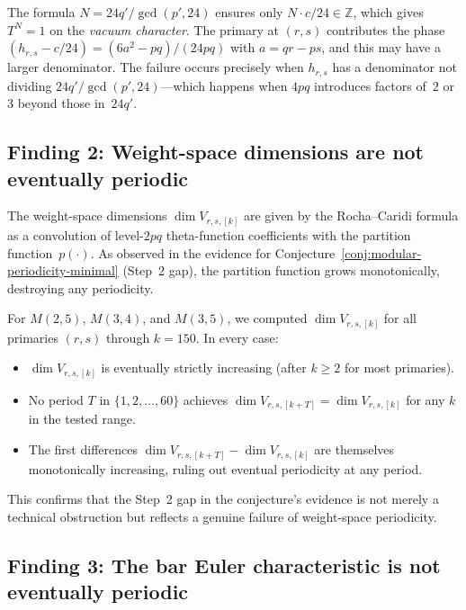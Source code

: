 \documentclass[11pt]{article}
\begin{document}
\begin{remark}
The formula $N = 24q'/\gcd(p',24)$ ensures only
$N \cdot c/24 \in \mathbb{Z}$, which gives $T^N = 1$ on the
\emph{vacuum character}.  The primary at $(r,s)$ contributes
the phase $(h_{r,s} - c/24) = (6a^2 - pq)/(24pq)$ with
$a = qr - ps$, and this may have a larger denominator.  The
failure occurs precisely when $h_{r,s}$ has a denominator
not dividing $24q'/\gcd(p',24)$---which happens when $4pq$
introduces factors of~$2$ or~$3$ beyond those in~$24q'$.
\end{remark}

\subsection*{Finding 2: Weight-space dimensions are not
  eventually periodic}

The weight-space dimensions $\dim V_{r,s,[k]}$ are given by
the Rocha--Caridi formula as a convolution of level-$2pq$
theta-function coefficients with the partition function~$p(\cdot)$.
As observed in the evidence for
Conjecture~\ref*{conj:modular-periodicity-minimal} (Step~2
gap), the partition function grows monotonically, destroying
any periodicity.

\begin{computation}
\label{comp:weight-space-monotone}
For $M(2,5)$, $M(3,4)$, and $M(3,5)$, we computed
$\dim V_{r,s,[k]}$ for all primaries $(r,s)$ through
$k = 150$.  In every case:
\begin{itemize}[leftmargin=1.8em]
\item $\dim V_{r,s,[k]}$ is eventually strictly increasing
  (after $k \ge 2$ for most primaries).
\item No period $T$ in $\{1, 2, \ldots, 60\}$ achieves
  $\dim V_{r,s,[k+T]} = \dim V_{r,s,[k]}$ for any $k$ in
  the tested range.
\item The first differences $\dim V_{r,s,[k+T]} - \dim V_{r,s,[k]}$
  are themselves monotonically increasing, ruling out eventual
  periodicity at any period.
\end{itemize}
This confirms that the Step~2 gap in the conjecture's evidence
is not merely a technical obstruction but reflects a genuine
failure of weight-space periodicity.
\end{computation}

\subsection*{Finding 3: The bar Euler characteristic is not
  eventually periodic}
\end{document}
